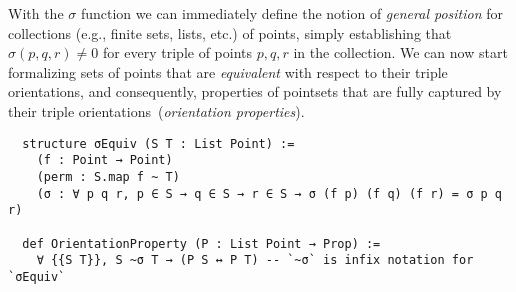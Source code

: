 With the $\sigma$ function we can immediately define the notion of \emph{general position} for collections (e.g., finite sets, lists, etc.) of points, simply establishing that $\sigma(p, q, r) \neq 0$ for every triple of points $p, q, r$ in the collection.
We can now start formalizing sets of points that are \emph{equivalent} with respect to their triple orientations, and consequently, properties of pointsets that are fully captured by their triple orientations~(\emph{orientation properties}).

\begin{lstlisting}
  structure σEquiv (S T : List Point) :=
    (f : Point → Point)
    (perm : S.map f ~ T)
    (σ : ∀ p q r, p ∈ S → q ∈ S → r ∈ S → σ (f p) (f q) (f r) = σ p q r)

  def OrientationProperty (P : List Point → Prop) :=
    ∀ {{S T}}, S ~σ T → (P S ↔ P T) -- `~σ` is infix notation for `σEquiv`
\end{lstlisting}

